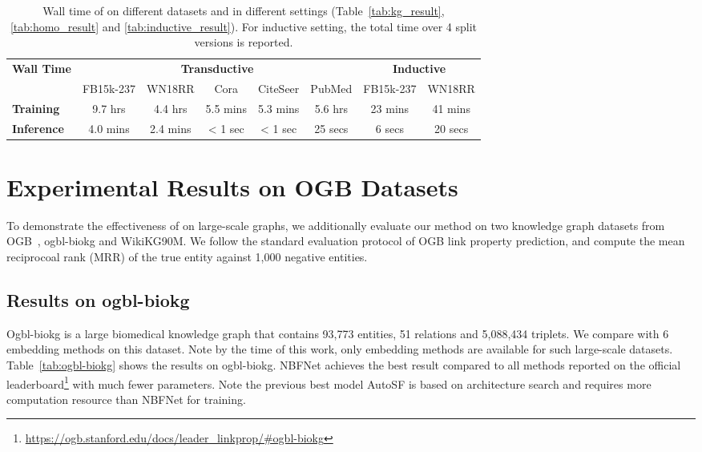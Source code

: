 \begin{table}[!h]
    \centering
    \caption{Wall time of \method on different datasets and in different settings (Table~\ref{tab:kg_result}, \ref{tab:homo_result} and \ref{tab:inductive_result}). For inductive setting, the total time over 4 split versions is reported.}
    \label{tab:wall_time}
    \begin{adjustbox}{max width=\textwidth}
    \begin{tabular}{lccccccc}
        \toprule
        \multirow{2}{*}{\bf{Wall Time}} & \multicolumn{5}{c}{\bf{Transductive}} & \multicolumn{2}{c}{\bf{Inductive}} \\
                       & FB15k-237 & WN18RR & Cora & CiteSeer & PubMed & FB15k-237 & WN18RR \\
        \midrule
        \bf{Training}  & 9.7 hrs  & 4.4 hrs  & 5.5 mins & 5.3 mins & 5.6 hrs & 23 mins & 41 mins \\
        \bf{Inference} & 4.0 mins & 2.4 mins & < 1 sec & < 1 sec & 25 secs & 6 secs & 20 secs \\
        \bottomrule
    \end{tabular}
    \end{adjustbox}
\end{table}

\section{Experimental Results on OGB Datasets}
\label{app:ogb}

To demonstrate the effectiveness of \method on large-scale graphs, we additionally evaluate our method on two knowledge graph datasets from OGB~\cite{hu2020ogb}, ogbl-biokg and WikiKG90M. We follow the standard evaluation protocol of OGB link property prediction, and compute the mean reciprocoal rank (MRR) of the true entity against 1,000 negative entities.

\subsection{Results on ogbl-biokg}

Ogbl-biokg is a large biomedical knowledge graph that contains 93,773 entities, 51 relations and 5,088,434 triplets. We compare \method with 6 embedding methods on this dataset. Note by the time of this work, only embedding methods are available for such large-scale datasets. Table~\ref{tab:ogbl-biokg} shows the results on ogbl-biokg. NBFNet achieves the best result compared to all methods reported on the official leaderboard\footnote{\url{https://ogb.stanford.edu/docs/leader_linkprop/\#ogbl-biokg}} with much fewer parameters. Note the previous best model AutoSF is based on architecture search and requires more computation resource than NBFNet for training.

